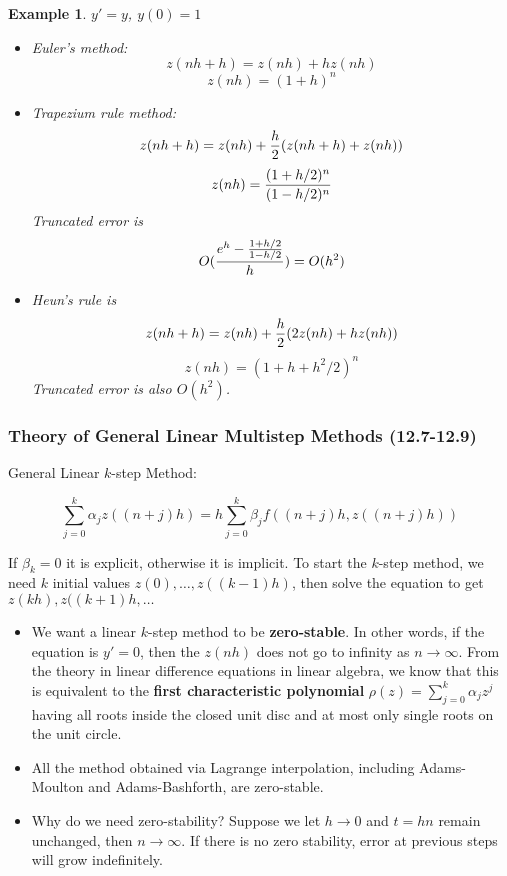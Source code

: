 \documentclass[20pt]{article} %
\theoremstyle{break}
\newtheorem{exa}[definition]{Example}
\begin{document}
\begin{exa}
  $y'=y$, $y(0)=1$
  \begin{itemize}
  \item Euler's method:
    \[z(nh+h)=z(nh)+hz(nh)\]
    \[z(nh)=(1+h)^n\]
  \item Trapezium rule method:
    \[z(nh+h)=z(nh)+{h\over 2}(z(nh+h)+z(nh))\]
    \[z(nh)={(1+h/2)^n\over (1-h/2)^n}\]
    Truncated error is
    \[O({e^h-{1+h/2\over 1-h/2}\over h})=O(h^2)\]
  \item Heun's rule is
    \[z(nh+h)=z(nh)+{h\over 2}(2z(nh)+hz(nh))\]
    \[z(nh)=(1+h+h^2/2)^n\]
    Truncated error is also $O(h^2)$.
  \end{itemize}
\end{exa}


\newpage

\subsubsection{Theory of General Linear Multistep Methods (12.7-12.9)}

General Linear $k$-step Method:

\[\sum_{j=0}^k\alpha_jz((n+j)h)=h\sum_{j=0}^k\beta_jf((n+j)h, z((n+j)h))\]

If $\beta_k=0$ it is explicit, otherwise it is implicit. To start the $k$-step method, we need $k$ initial values $z(0), \dots, z((k-1)h)$, then solve the equation to get $z(kh), z((k+1)h, \dots$

\begin{itemize}  
\item We want a linear $k$-step method to be {\bf zero-stable}. In other words, if the equation is $y'=0$, then the $z(nh)$ does not go to infinity as $n\rightarrow\infty$. From the theory in linear difference equations in linear algebra, we know that this is equivalent to the {\bf first characteristic polynomial} $\rho(z)=\sum_{j=0}^k\alpha_jz^j$ having all roots inside the closed unit disc and at most only single roots on the unit circle.
\item All the method obtained via Lagrange interpolation, including Adams-Moulton and Adams-Bashforth, are zero-stable.

\newpage

\item Why do we need zero-stability? Suppose we let $h\rightarrow 0$ and $t=hn$ remain unchanged, then $n\rightarrow\infty$. If there is no zero stability, error at previous steps will grow indefinitely.
\end{itemize}
\end{document}
